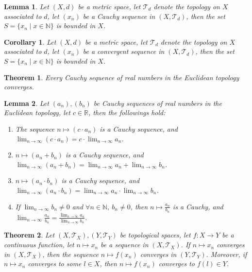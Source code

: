 \documentclass[11pt]{article}
\theoremstyle{break}
\theoremstyle{break}
\newtheorem{thm}{Theorem}[section]
\newtheorem{lem}{Lemma}[thm]
\newtheorem{corL}{Corollary}[lem]
\newcommand{\R}{\mathbb{R}}
\newcommand{\N}{\mathbb{N}}
\newcommand{\T}{\mathcal{T}}
\begin{document}
	\begin{lem}
		Let $(X,d)$ be a metric space, let $\T_d$ denote the topology on $X$ associated to $d$, let $(x_n)$ be a Cauchy sequence in $(X,\T_d)$, then the set $S = \{ x_n \mid x \in \N \} $ is bounded in $X$.
	\end{lem}
	
	\begin{corL}
		Let $(X,d)$ be a metric space, let $\T_d$ denote the topology on $X$ associated to $d$, let $(x_n)$ be a convergent sequence in $(X,\T_d)$, then the set $S = \{ x_n \mid x \in \N \} $ is bounded in $X$.
	\end{corL}
	
	\begin{thm}
		Every Cauchy sequence of real numbers in the Euclidean topology converges.
	\end{thm}
	
	\begin{lem}
		Let $(a_n),(b_n)$ be Cauchy sequences of real numbers in the Euclidean topology, let $c \in \R$, then the followings hold:
		\begin{enumerate}[topsep=3pt,itemsep=-1ex,partopsep=1ex,parsep=1ex]
		\item The sequence $n \mapsto (c \cdot a_n)$ is a Cauchy sequence, and $\lim_{n \to \infty}(c \cdot a_n)=c \cdot \lim_{n \to \infty} a_n$.
		\item $n \mapsto (a_n +b_n)$ is a Cauchy sequence, and $\lim_{n \to \infty}(a_n+b_n) = \lim_{n \to \infty}a_n +\lim_{n \to \infty} b_n$.
		\item $n \mapsto (a_n \cdot b_n)$ is a Cauchy sequence, and $\lim_{n \to \infty}(a_n \cdot b_n) = \lim_{n \to \infty}a_n \cdot \lim_{n \to \infty} b_n$.
		\item If $\lim_{n \to \infty} b_n \neq 0$ and $\forall n \in \N, \ b_n \neq 0$, then $n \mapsto \frac{a_n}{b_n}$ is a Cauchy, and  $\lim_{n \to \infty} \frac{a_n}{b_n} = \frac{\lim_{n \to \infty} a_n}{\lim_{n \to \infty} b_n}$.
		\end{enumerate}
	\end{lem}

	\begin{thm}
		Let $(X,\T_X), (Y,\T_Y)$ be topological spaces, let $f:X \to Y$ be a continuous function, let $n \mapsto x_n$ be a sequence in $(X,\T_X)$. If $n \mapsto x_n$ converges in $(X,\T_X)$, then the sequence $n \mapsto f(x_n)$ converges in $(Y,\T_Y)$. Moreover, if $n \mapsto x_n$ converges to some $l \in X$, then $n \mapsto f(x_n)$ converges to $f(l) \in Y$.
	\end{thm}
	
\end{document}

